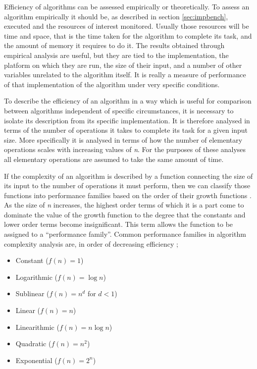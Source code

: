 \documentclass[12pt, a4paper]{article}
\begin{document}
Efficiency of algorithms can be assessed empirically or theoretically. To assess an algorithm empirically it should be, as described in section \ref{sec:impbench}, executed and the resources of interest monitored. Usually those resources will be time and space, that is the time taken for the algorithm to complete its task, and the amount of memory it requires to do it. The results obtained through empirical analysis are useful, but they are tied to the implementation, the platform on which they are run, the size of their input, and a number of other variables unrelated to the algorithm itself. It is really a measure of performance of that implementation of the algorithm under very specific conditions.

To describe the efficiency of an algorithm in a way which is useful for comparison between algorithms independent of specific circumstances, it is necessary to isolate its description from its specific implementation. It is therefore analysed in terms of the number of operations it takes to complete its task for a given input size. More specifically it is analysed in terms of how the number of elementary operations scales with increasing values of \emph{n}. For the purposes of these analyses all elementary operations are assumed to take the same amount of time.

If the complexity of an algorithm is described by a function connecting the size of its input to the number of operations it must perform, then we can classify those functions into performance families based on the order of their growth functions \autocite[18]{heineman2016algorithms}. As the size of \emph{n} increases, the highest order terms of which it is a part come to dominate the value of the growth function to the degree that the constants and lower order terms become insignificant. This term allows the function to be assigned to a ``performance family''. Common performance families in algorithm complexity analysis are, in order of decreasing efficiency \autocite[19]{heineman2016algorithms};

\begin{itemize}
    \item Constant ($f(n)=1$)
    \item Logarithmic ($f(n) = \log n$)
    \item Sublinear ($f(n) = n^{d}$ for $d<1$)
    \item Linear ($f(n) = n$)
    \item Linearithmic ($f(n) = n\log n$)
    \item Quadratic ($f(n) = n^{2}$)
    \item Exponential ($f(n) = 2^{n}$)
\end{itemize}
\end{document}
